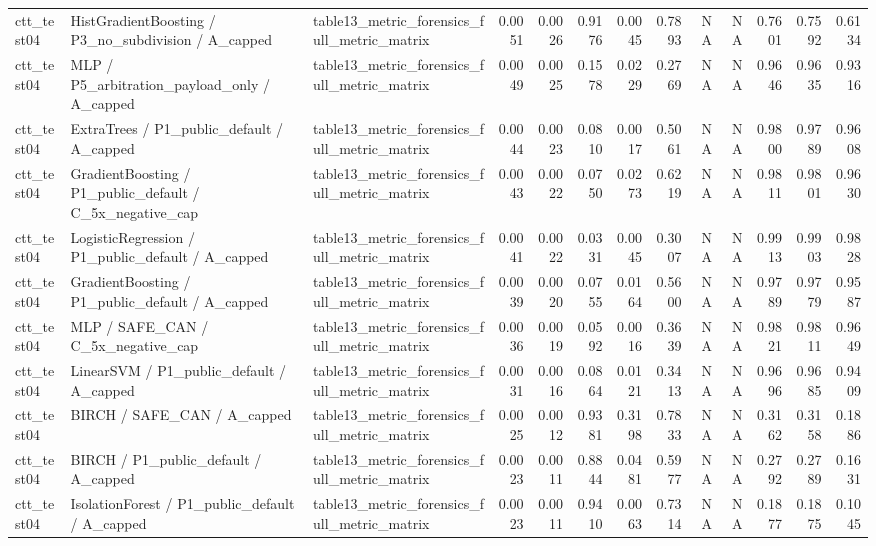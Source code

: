 \begin{tabular}{lllrrrrrrrrrr}
ctt\_test04 & HistGradientBoosting / P3\_no\_subdivision / A\_capped & table13\_metric\_forensics\_full\_metric\_matrix & 0.0051 & 0.0026 & 0.9176 & 0.0045 & 0.7893 & NA & NA & 0.7601 & 0.7592 & 0.6134 \\
ctt\_test04 & MLP / P5\_arbitration\_payload\_only / A\_capped & table13\_metric\_forensics\_full\_metric\_matrix & 0.0049 & 0.0025 & 0.1578 & 0.0229 & 0.2769 & NA & NA & 0.9646 & 0.9635 & 0.9316 \\
ctt\_test04 & ExtraTrees / P1\_public\_default / A\_capped & table13\_metric\_forensics\_full\_metric\_matrix & 0.0044 & 0.0023 & 0.0810 & 0.0017 & 0.5061 & NA & NA & 0.9800 & 0.9789 & 0.9608 \\
ctt\_test04 & GradientBoosting / P1\_public\_default / C\_5x\_negative\_cap & table13\_metric\_forensics\_full\_metric\_matrix & 0.0043 & 0.0022 & 0.0750 & 0.0273 & 0.6219 & NA & NA & 0.9811 & 0.9801 & 0.9630 \\
ctt\_test04 & LogisticRegression / P1\_public\_default / A\_capped & table13\_metric\_forensics\_full\_metric\_matrix & 0.0041 & 0.0022 & 0.0331 & 0.0045 & 0.3007 & NA & NA & 0.9913 & 0.9903 & 0.9828 \\
ctt\_test04 & GradientBoosting / P1\_public\_default / A\_capped & table13\_metric\_forensics\_full\_metric\_matrix & 0.0039 & 0.0020 & 0.0755 & 0.0164 & 0.5600 & NA & NA & 0.9789 & 0.9779 & 0.9587 \\
ctt\_test04 & MLP / SAFE\_CAN / C\_5x\_negative\_cap & table13\_metric\_forensics\_full\_metric\_matrix & 0.0036 & 0.0019 & 0.0592 & 0.0016 & 0.3639 & NA & NA & 0.9821 & 0.9811 & 0.9649 \\
ctt\_test04 & LinearSVM / P1\_public\_default / A\_capped & table13\_metric\_forensics\_full\_metric\_matrix & 0.0031 & 0.0016 & 0.0864 & 0.0121 & 0.3413 & NA & NA & 0.9696 & 0.9685 & 0.9409 \\
ctt\_test04 & BIRCH / SAFE\_CAN / A\_capped & table13\_metric\_forensics\_full\_metric\_matrix & 0.0025 & 0.0012 & 0.9381 & 0.3198 & 0.7833 & NA & NA & 0.3162 & 0.3158 & 0.1886 \\
ctt\_test04 & BIRCH / P1\_public\_default / A\_capped & table13\_metric\_forensics\_full\_metric\_matrix & 0.0023 & 0.0011 & 0.8844 & 0.0481 & 0.5977 & NA & NA & 0.2792 & 0.2789 & 0.1631 \\
ctt\_test04 & IsolationForest / P1\_public\_default / A\_capped & table13\_metric\_forensics\_full\_metric\_matrix & 0.0023 & 0.0011 & 0.9410 & 0.0063 & 0.7314 & NA & NA & 0.1877 & 0.1875 & 0.1045 \\

\end{tabular}
